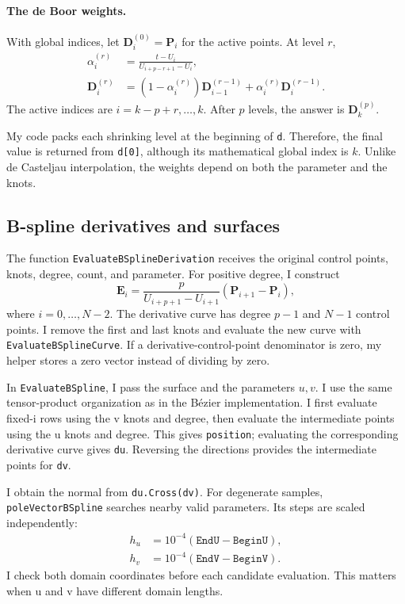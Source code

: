 \documentclass[acmtog]{acmart}
\begin{document}
\paragraph{The de Boor weights.}
With global indices, let $\mathbf D_i^{(0)}=\mathbf P_i$ for the active points. At level $r$,
\begin{equation}
\begin{aligned}
\alpha_i^{(r)}&=\frac{t-U_i}{U_{i+p-r+1}-U_i},\\
\mathbf D_i^{(r)}
&=(1-\alpha_i^{(r)})\mathbf D_{i-1}^{(r-1)}
+\alpha_i^{(r)}\mathbf D_i^{(r-1)}.
\end{aligned}
\end{equation}
The active indices are $i=k-p+r,\ldots,k$. After $p$ levels, the answer is $\mathbf D_k^{(p)}$.

My code packs each shrinking level at the beginning of \texttt{d}. Therefore, the final value is returned from \texttt{d[0]}, although its mathematical global index is $k$. Unlike de Casteljau interpolation, the weights depend on both the parameter and the knots.

\subsection{B-spline derivatives and surfaces}
The function \texttt{EvaluateBSplineDerivation} receives the original control points, knots, degree, count, and parameter. For positive degree, I construct
\begin{equation}
\mathbf E_i=
\frac{p}{U_{i+p+1}-U_{i+1}}(\mathbf P_{i+1}-\mathbf P_i),
\end{equation}
where $i=0,\ldots,N-2$. The derivative curve has degree $p-1$ and $N-1$ control points. I remove the first and last knots and evaluate the new curve with \texttt{EvaluateBSplineCurve}. If a derivative-control-point denominator is zero, my helper stores a zero vector instead of dividing by zero.

In \texttt{EvaluateBSpline}, I pass the surface and the parameters $u,v$. I use the same tensor-product organization as in the B\'ezier implementation. I first evaluate fixed-i rows using the v knots and degree, then evaluate the intermediate points using the u knots and degree. This gives \texttt{position}; evaluating the corresponding derivative curve gives \texttt{du}. Reversing the directions provides the intermediate points for \texttt{dv}.

I obtain the normal from \texttt{du.Cross(dv)}. For degenerate samples, \texttt{poleVectorBSpline} searches nearby valid parameters. Its steps are scaled independently:
\begin{equation}
\begin{aligned}
h_u&=10^{-4}(\texttt{EndU}-\texttt{BeginU}),\\
h_v&=10^{-4}(\texttt{EndV}-\texttt{BeginV}).
\end{aligned}
\end{equation}
I check both domain coordinates before each candidate evaluation. This matters when u and v have different domain lengths.
\end{document}
